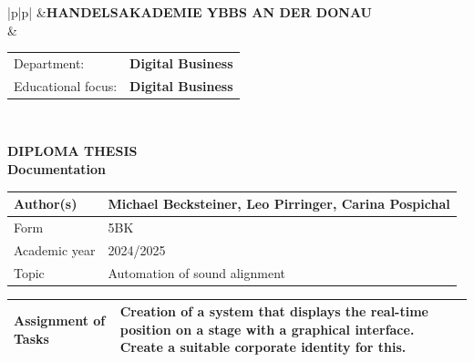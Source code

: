 \begin{tabular}{|p{\haklogobreite}|p{\beschriftungsbreite}|}
	\hline
	&{\vspace{0.15em}\textbf{HANDELSAKADEMIE YBBS AN DER DONAU}}\\[1.05em]
	\cline{2-2}
	& { \begin{tabular}{p{\feldA} p{\feldB}}
    		Department:&\textbf{Digital Business}\\
			Educational focus:&\textbf{Digital Business}\\
		\end{tabular}
	}\\
	\hline
\end{tabular}

\begin{center}
 \LARGE \textbf{DIPLOMA THESIS}\\
 \Large \textbf{Documentation}\\
 \normalsize
\end{center}

\linespread{1.1} \normalsize
\begin{tabular}{|p{\feldC}|p{\feldD}|}
 \hline
 Author(s) & Michael Becksteiner, Leo Pirringer, Carina Pospichal\\
 \hline
 Form & 5BK \\ Academic year & 2024/2025 \\
 \hline
 Topic & Automation of sound alignment \\
 \hline
\end{tabular}

\begin{tabular}{|p{\feldC}|p{\feldD}|}
 \hline
 Assignment of Tasks & Creation of a system that displays the real-time position on a stage with a graphical interface. Create a suitable corporate identity for this.\\
 \hline
\end{tabular}

